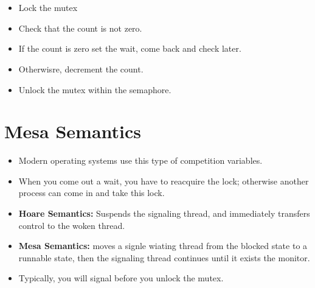 \documentclass[]{article}
\begin{document}
\section{}
\begin{itemize}
\item Lock the mutex
\item Check that the count is not zero.
\item If the count is zero set the wait, come back and check later.
\item Otherwisre, decrement the count.
\item Unlock the mutex within the semaphore.
\end{itemize}

\section{Mesa Semantics}
\begin{itemize}
\item Modern operating systems use this type of competition variables.
\item When you come out a wait, you have to reacquire the lock; otherwise
another process can come in and take this lock.
\item \textbf{Hoare Semantics:} Suspends the signaling thread, and immediately
transfers control to the woken thread.
\item \textbf{Mesa Semantics:}  moves a signle wiating thread
from the blocked state to a runnable state, then the signaling thread continues
until it exists the monitor.
\item Typically, you will signal before you unlock the mutex.
\end{itemize}
\end{document}
